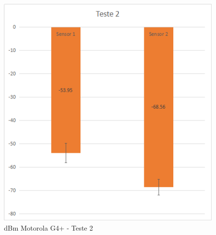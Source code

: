 \begin{figure}[htb]
	\caption{\label{fig-modulos-esp}dBm Motorola G4+ - Teste 2}
	\begin{center}
		\includegraphics[width=1\textwidth]{060-testes/data-analisis/distance-mg4plus-netflix/target-Teste2.png}
	\end{center}
\end{figure}
